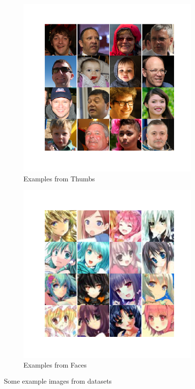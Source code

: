 \documentclass[10pt,twocolumn,letterpaper]{article}
\begin{document}
\vspace{-2.5em}
\begin{figure}[h]
   \centering
   \begin{subfigure}{0.48\linewidth}
      \centering
      \includegraphics[width=\linewidth]{thumbs-examples}
      \vspace{-2em}
      \caption{Examples from Thumbs}
   \end{subfigure}
   \begin{subfigure}{0.48\linewidth}
      \centering
      \includegraphics[width=\linewidth]{faces-examples}
      \vspace{-2em}
      \caption{Examples from Faces}
   \end{subfigure}
   \caption{Some example images from datasets}
   \label{fig:dataset-examples}
\end{figure}
\end{document}
